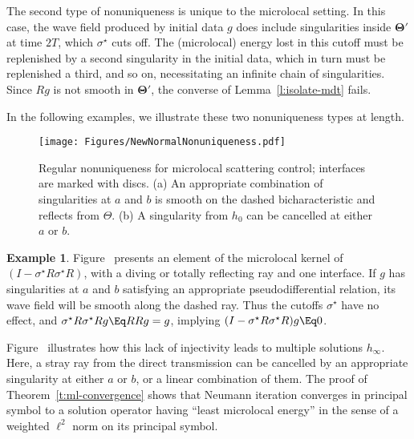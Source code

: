\documentclass[10pt]{article}
\theoremstyle{plain}
\theoremstyle{definition}
\newtheorem{example}{Example}
\theoremstyle{remark}
\numberwithin{theorem}{section}
\numberwithin{example}{section}
\numberwithin{equation}{section}
\numberwithin{figure}{section}
\newcommand\bTheta{\boldsymbol\Theta}
\newcommand\eqml{\Eq}					%
\begin{document}
The second type of nonuniqueness is unique to the microlocal setting. In this case, the wave field produced by initial data $g$ does include singularities inside $\bTheta'$ at time $2T$, which $\sigma^\star$ cuts off. The (microlocal) energy lost in this cutoff must be replenished by a second singularity in the initial data, which in turn must be replenished a third, and so on, necessitating an infinite chain of singularities. Since $Rg$ is not smooth in $\bTheta'$, the converse of Lemma~\ref{l:isolate-mdt} fails.

In the following examples, we illustrate these two nonuniqueness types at length.

\begin{figure}
\centering

\mbox{}
{}
\hfill
\quad\texttt{[image: Figures/NewNormalNonuniqueness.pdf]}%
\hfill
{}
\mbox{}

\caption{Regular nonuniqueness for microlocal scattering control; interfaces are marked with discs. (a) An appropriate combination of singularities at $a$ and $b$ is smooth on the dashed bicharacteristic and reflects from $\Theta$. (b) A singularity from $h_0$ can be cancelled at either $a$ or $b$.}

\label{f:regular-ml-nonuniqueness}
\end{figure}

\begin{example}
Figure~ presents an element of the microlocal kernel of $(I-\sigma^\star R\sigma^\star R)$, with a diving or totally reflecting ray and one interface. If $g$ has singularities at $a$ and $b$ satisfying an appropriate pseudodifferential relation, its wave field will be smooth along the dashed ray. Thus the cutoffs $\sigma^\star$ have no effect, and $\sigma^\star R\sigma^\star R g\eqml RRg=g$, implying $(I-\sigma^\star R\sigma^\star R)g\eqml 0$.

Figure~ illustrates how this lack of injectivity leads to multiple solutions $h_\infty$. Here, a stray ray from the direct transmission can be cancelled by an appropriate singularity at either $a$ or $b$, or a linear combination of them. The proof of Theorem~\ref{t:ml-convergence} shows that Neumann iteration converges in principal symbol to a solution operator having ``least microlocal energy'' in the sense of a weighted $\ell^2$ norm on its principal symbol.

\label{x:ml-nonuniqueness-1}
\end{example}
\end{document}
